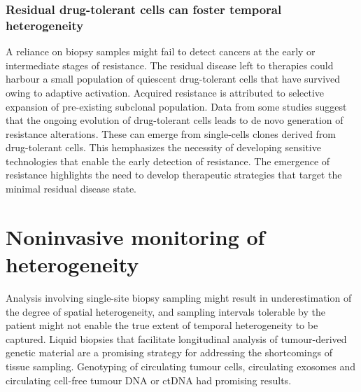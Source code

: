 		\subsubsection{Residual drug-tolerant cells can foster temporal heterogeneity}
		A reliance on biopsy samples might fail to detect cancers at the early or intermediate stages of resistance.
		The residual disease left to therapies could harbour a small population of quiescent drug-tolerant cells that have survived owing to adaptive activation.
		Acquired resistance is attributed to selective expansion of pre-existing subclonal population.
		Data from some studies suggest that the ongoing evolution of drug-tolerant cells leads to de novo generation of resistance alterations.
		These can emerge from single-cells clones derived from drug-tolerant cells.
		This hemphasizes the necessity of developing sensitive technologies that enable the early detection of resistance.
		The emergence of resistance highlights the need to develop therapeutic strategies that target the minimal residual disease state.

\section{Noninvasive monitoring of heterogeneity}
Analysis involving single-site biopsy sampling might result in underestimation of the degree of spatial heterogeneity, and sampling intervals tolerable by the patient might not enable the true extent of temporal heterogeneity to be captured.
Liquid biopsies that facilitate longitudinal analysis of tumour-derived genetic material are a promising strategy for addressing the shortcomings of tissue sampling.
Genotyping of circulating tumour cells, circulating exosomes and circulating cell-free tumour DNA or ctDNA had promising results.

